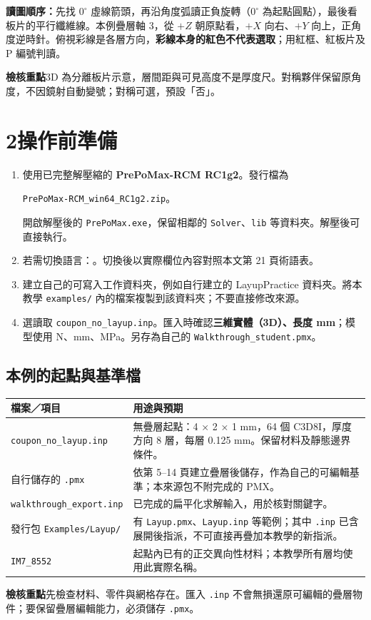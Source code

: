 \documentclass[11pt,a4paper,fontset=none]{ctexart}
\newcommand{\page}[1]{\clearpage\section*{#1}\addcontentsline{toc}{section}{#1}}
\newcommand{\note}[1]{\par\smallskip\noindent\colorbox{light}{\parbox{\dimexpr\linewidth-2\fboxsep\relax}{\textbf{檢核重點}\quad #1}}\par\smallskip}
\begin{document}
\textbf{讀圖順序：}先找 $0^\circ$ 虛線箭頭，再沿角度弧讀正負旋轉（$0^\circ$ 為起點圓點），最後看板片的平行纖維線。本例疊層軸 3，從 $+Z$ 朝原點看，$+X$ 向右、$+Y$ 向上，正角度逆時針。俯視彩線是各層方向，\textbf{彩線本身的紅色不代表選取}；用紅框、紅板片及 P 編號判讀。
\note{3D 為分離板片示意，層間距與可見高度不是厚度尺。對稱夥伴保留原角度，不因鏡射自動變號；對稱可選，預設「否」。}

\page{2\quad 操作前準備}
\begin{enumerate}
\item 使用已完整解壓縮的 \textbf{PrePoMax-RCM RC1g2}。發行檔為\par
\texttt{PrePoMax-RCM\_win64\_RC1g2.zip}。\par
開啟解壓後的 \texttt{PrePoMax.exe}，保留相鄰的 \texttt{Solver}、\texttt{lib} 等資料夾。解壓後可直接執行。
\item 若需切換語言：。切換後以實際欄位內容對照本文第 21 頁術語表。
\item 建立自己的可寫入工作資料夾，例如自行建立的 LayupPractice 資料夾。將本教學 \texttt{examples/} 內的檔案複製到該資料夾；不要直接修改來源。
\item 選讀取 \texttt{coupon\_no\_layup.inp}。匯入時確認\textbf{三維實體（3D）、長度 mm}；模型使用 N、mm、MPa。另存為自己的 \texttt{Walkthrough\_student.pmx}。
\end{enumerate}
\subsection*{本例的起點與基準檔}
\par\noindent\begin{tabularx}{\linewidth}{@{}lY@{}}\toprule
檔案／項目 & 用途與預期 \\\midrule
\texttt{coupon\_no\_layup.inp} & 無疊層起點：4 × 2 × 1 mm，64 個 C3D8I，厚度方向 8 層，每層 0.125 mm。保留材料及靜態邊界條件。 \\
自行儲存的 \texttt{.pmx} & 依第 5--14 頁建立疊層後儲存，作為自己的可編輯基準；本來源包不附完成的 PMX。 \\
\texttt{walkthrough\_export.inp} & 已完成的扁平化求解輸入，用於核對關鍵字。 \\
發行包 \texttt{Examples/Layup/} & 有 \texttt{Layup.pmx}、\texttt{Layup.inp} 等範例；其中 \texttt{.inp} 已含展開後指派，不可直接再疊加本教學的新指派。 \\
\texttt{IM7\_8552} & 起點內已有的正交異向性材料；本教學所有層均使用此實際名稱。 \\\bottomrule
\end{tabularx}\par
\note{先檢查材料、零件與網格存在。匯入 \texttt{.inp} 不會無損還原可編輯的疊層物件；要保留疊層編輯能力，必須儲存 \texttt{.pmx}。}
\end{document}
